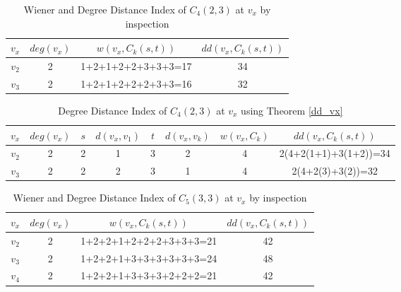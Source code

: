 \begin{table}[!ht]
\caption{Wiener and Degree Distance Index of $C_4(2,3)$ at $v_x$ by inspection}
\begin{center}
\begin{tabular}{|c|c|c|c|}
\hline 
$v_x$ & $deg(v_x)$ & $w(v_x,C_k(s,t))$ & $dd(v_x,C_k(s,t))$ \\ 
\hline 
$v_2$ & 2 & 1+2+1+2+2+3+3+3=17 & 34 \\ 
\hline 
$v_3$ & 2 & 1+2+1+2+2+2+3+3=16 & 32 \\ 
\hline 
\end{tabular} 
\end{center}
\label{tab:vx_mg1}
\end{table}

\begin{table}[!ht]
\caption{Degree Distance Index of $C_4(2,3)$ at $v_x$ using Theorem \ref{dd_vx}}
\begin{center}
\begin{tabular}{|c|c|c|c|c|c|c|c|}
\hline 
$v_x$ & $deg(v_x)$ & $s$ & $d(v_x,v_1)$ & $t$ & $d(v_x,v_k)$ & $w(v_x,C_k)$ & $dd(v_x,C_k(s,t))$ \\ 
\hline 
$v_2$ & 2 & 2 & 1 & 3 & 2 & 4 & 2(4+2(1+1)+3(1+2))=34 \\ 
\hline 
$v_3$ & 2 & 2 & 2 & 3 & 1 & 4 & 2(4+2(3)+3(2))=32 \\ 
\hline 
\end{tabular} 
\end{center}
\label{tab:v_x_mg1_form}
\end{table}

\newpage

\begin{table}[!ht]
\caption{Wiener and Degree Distance Index of $C_5(3,3)$ at $v_x$ by inspection}
\begin{center}
\begin{tabular}{|c|c|c|c|}
\hline 
$v_x$ & $deg(v_x)$ & $w(v_x,C_k(s,t))$ & $dd(v_x,C_k(s,t))$ \\ 
\hline 
$v_2$ & 2 & 1+2+2+1+2+2+2+3+3+3=21 & 42 \\ 
\hline 
$v_3$ & 2 & 1+2+2+1+3+3+3+3+3+3=24 & 48 \\ 
\hline 
$v_4$ & 2 & 1+2+2+1+3+3+3+2+2+2=21 & 42 \\ 
\hline 
\end{tabular} 
\end{center}
\label{tab:vx_mg2}
\end{table}


